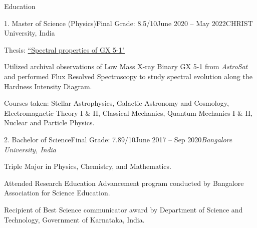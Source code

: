 \vspace{-0.8em}
\begin{section}{Education}
    \begin{subsection}{1. Master of Science (Physics)}{Final Grade: 8.5/10}{June 2020 -- May 2022}{CHRIST University, India}
        \item Thesis: \href{https://drive.google.com/file/d/1FP9Bz25hufUrWuRfMA0RLzUTm0Spqp-I/view?usp=sharing}{``Spectral properties of GX 5-1"} %
        \item [] Utilized archival observations of Low Mass X-ray Binary GX 5-1 from \textit{AstroSat} and performed Flux Resolved Spectroscopy to study spectral evolution along the Hardness Intensity Diagram.
        \item Courses taken: Stellar Astrophysics, Galactic Astronomy and Cosmology, Electromagnetic Theory I \& II, Classical Mechanics, Quantum Mechanics I \& II, Nuclear and Particle Physics.
    \end{subsection}
    \begin{subsection}{2. Bachelor of Science}{Final Grade: 7.89/10}{June 2017 -- Sep 2020}{\textit{Bangalore University, India}}
        \vspace{-0.2em}
        \item Triple Major in Physics, Chemistry, and Mathematics.
        \item Attended Research Education Advancement program conducted by Bangalore Association for Science Education.
        \item Recipient of Best Science communicator award by Department of Science and Technology, Government of Karnataka, India.
    \end{subsection}
\end{section}